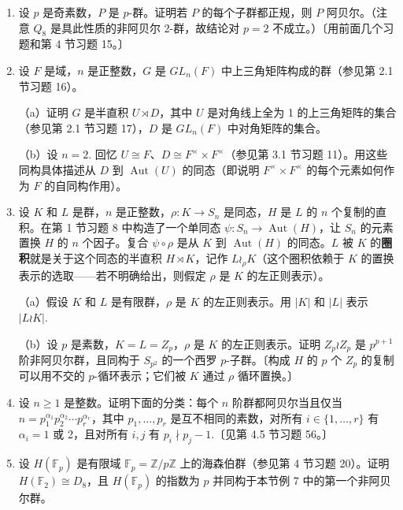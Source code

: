 \begin{enumerate}
\item 设 \(p\) 是奇素数，\(P\) 是 \(p\)-群。证明若 \(P\) 的每个子群都正规，则 \(P\) 阿贝尔。（注意 \(Q_8\) 是具此性质的非阿贝尔 2-群，故结论对 \(p=2\) 不成立。）〔用前面几个习题和第 4 节习题 15。〕

\item 设 \(F\) 是域，\(n\) 是正整数，\(G\) 是 \(GL_n(F)\) 中上三角矩阵构成的群（参见第 2.1 节习题 16）。

（a）证明 \(G\) 是半直积 \(U \rtimes D\)，其中 \(U\) 是对角线上全为 1 的上三角矩阵的集合（参见第 2.1 节习题 17），\(D\) 是 \(GL_n(F)\) 中对角矩阵的集合。

（b）设 \(n = 2\). 回忆 \(U \cong F\)、\(D \cong F^\times \times F^\times\)（参见第 3.1 节习题 11）。用这些同构具体描述从 \(D\) 到 \(\operatorname{Aut}(U)\) 的同态（即说明 \(F^\times \times F^\times\) 的每个元素如何作为 \(F\) 的自同构作用）。

\item 设 \(K\) 和 \(L\) 是群，\(n\) 是正整数，\(\rho : K \to S_n\) 是同态，\(H\) 是 \(L\) 的 \(n\) 个复制的直积。在第 1 节习题 8 中构造了一个单同态 \(\psi : S_n \to \operatorname{Aut}(H)\)，让 \(S_n\) 的元素置换 \(H\) 的 \(n\) 个因子。复合 \(\psi \circ \rho\) 是从 \(K\) 到 \(\operatorname{Aut}(H)\) 的同态。\(L\) 被 \(K\) 的\textbf{圈积}就是关于这个同态的半直积 \(H \rtimes K\)，记作 \(L \wr_\rho K\)（这个圈积依赖于 \(K\) 的置换表示的选取——若不明确给出，则假定 \(\rho\) 是 \(K\) 的左正则表示）。

（a）假设 \(K\) 和 \(L\) 是有限群，\(\rho\) 是 \(K\) 的左正则表示。用 \(|K|\) 和 \(|L|\) 表示 \(|L \wr K|\).

（b）设 \(p\) 是素数，\(K = L = Z_p\)，\(\rho\) 是 \(K\) 的左正则表示。证明 \(Z_p \wr Z_p\) 是 \(p^{p+1}\) 阶非阿贝尔群，且同构于 \(S_{p^2}\) 的一个西罗 \(p\)-子群。〔构成 \(H\) 的 \(p\) 个 \(Z_p\) 的复制可以用不交的 \(p\)-循环表示；它们被 \(K\) 通过 \(\rho\) 循环置换。〕

\item 设 \(n \geq 1\) 是整数。证明下面的分类：每个 \(n\) 阶群都阿贝尔当且仅当 \(n = p_1^{\alpha_1} p_2^{\alpha_2} \cdots p_r^{\alpha_r}\)，其中 \(p_1, \ldots, p_r\) 是互不相同的素数，对所有 \(i \in \{1, \ldots, r\}\) 有 \(\alpha_i = 1\) 或 2，且对所有 \(i, j\) 有 \(p_i \nmid p_j - 1\).〔见第 4.5 节习题 56。〕

\item 设 \(H(\mathbb{F}_p)\) 是有限域 \(\mathbb{F}_p = \mathbb{Z}/p\mathbb{Z}\) 上的海森伯群（参见第 4 节习题 20）。证明 \(H(\mathbb{F}_2) \cong D_8\)，且 \(H(\mathbb{F}_p)\) 的指数为 \(p\) 并同构于本节例 7 中的第一个非阿贝尔群。
\end{enumerate}
